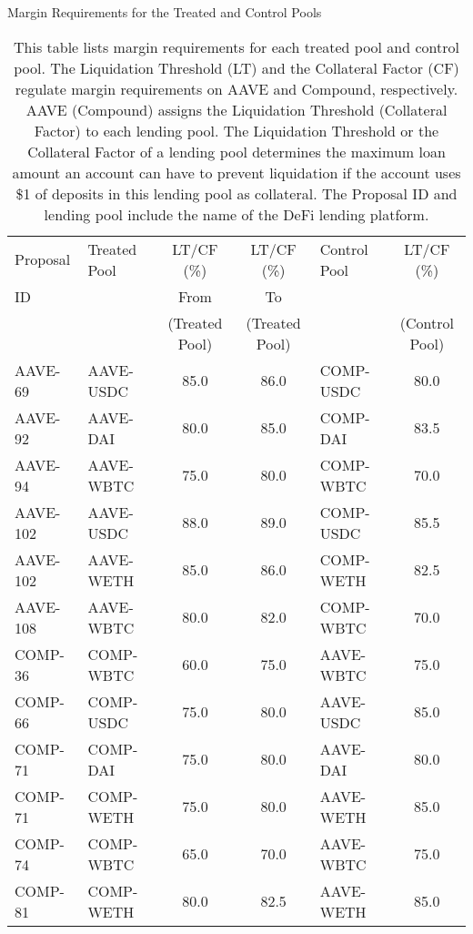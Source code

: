 \clearpage
\newpage
    \begin{landscape}
        

\begin{table}[ht!]
\caption{Margin Requirements for the Treated and Control Pools}\label{tab:proposal_margin}
\caption*{This table lists margin requirements for each treated pool and control pool. The Liquidation Threshold (LT) and the Collateral Factor (CF) regulate margin requirements on AAVE and Compound, respectively. AAVE (Compound) assigns the Liquidation Threshold (Collateral Factor) to each lending pool. The Liquidation Threshold or the Collateral Factor of a lending pool determines the maximum loan amount an account can have to prevent liquidation if the account uses \$1 of deposits in this lending pool as collateral. The Proposal ID and lending pool include the name of the DeFi lending platform.}


\centering
\def\sym#1{\ifmmode^{#1}\else\(^{#1}\)\fi}


\begin{tabular*}{\linewidth}{@{\extracolsep{\fill}}llcclc}
    \toprule
    Proposal & Treated Pool & LT/CF (\%)  & LT/CF (\%) & Control Pool & LT/CF (\%) \\
     ID &   &   From &   To & &  \\
          &       & (Treated Pool) & (Treated Pool)&  & (Control Pool) \\
          \midrule
    AAVE-69 & AAVE-USDC & 85.0 & 86.0 & COMP-USDC& 80.0 \\[2pt]
    AAVE-92 & AAVE-DAI & 80.0 & 85.0& COMP-DAI & 83.5 \\[2pt]
    AAVE-94 & AAVE-WBTC & 75.0 & 80.0 & COMP-WBTC& 70.0 \\[2pt]
    AAVE-102 & AAVE-USDC & 88.0 & 89.0& COMP-USDC & 85.5 \\[2pt]
    AAVE-102 & AAVE-WETH & 85.0 & 86.0& COMP-WETH & 82.5 \\[2pt]
    AAVE-108 & AAVE-WBTC & 80.0 & 82.0& COMP-WBTC & 70.0 \\[2pt]
    COMP-36 & COMP-WBTC & 60.0 & 75.0 & AAVE-WBTC& 75.0 \\[2pt]
    COMP-66 & COMP-USDC & 75.0 & 80.0 & AAVE-USDC& 85.0 \\[2pt]
    COMP-71 & COMP-DAI & 75.0 & 80.0 & AAVE-DAI& 80.0 \\[2pt]
    COMP-71 & COMP-WETH & 75.0 & 80.0 & AAVE-WETH& 85.0 \\[2pt]
    COMP-74 & COMP-WBTC & 65.0 & 70.0 & AAVE-WBTC& 75.0 \\[2pt]
    COMP-81 & COMP-WETH & 80.0 & 82.5 & AAVE-WETH & 85.0 \\
    \midrule

          \end{tabular*} 



\end{table}%
    \end{landscape}

